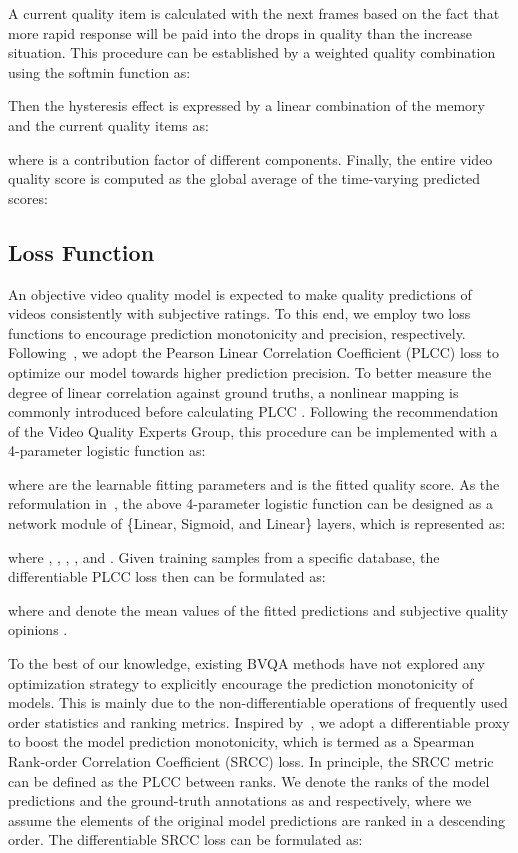 \documentclass[journal]{IEEEtran}
\begin{document}
{{A current quality item  is calculated with the next  frames based on the fact that more rapid response will be paid into the drops in quality than the increase situation. This procedure can be established by a weighted quality combination using the softmin function as:

Then the hysteresis effect is expressed by a linear combination of the memory and the current quality items as:

where  is a contribution factor of different components.
Finally, the entire video quality score is computed as the global average of the time-varying predicted scores:


\subsection{Loss Function}
\label{Sec:LossFunction}


An objective video quality model is expected to make quality predictions of videos consistently with subjective ratings. To this end, we employ two loss functions to encourage prediction monotonicity and precision, respectively. Following~\cite{liu2018end, li2021unified}, we adopt the Pearson Linear Correlation Coefficient (PLCC) loss to optimize our model towards higher prediction precision. To better measure the degree of linear correlation against ground truths, a nonlinear mapping is commonly introduced before calculating PLCC \cite{zhang2020blind, chen2020perceptual}. Following the recommendation of the Video Quality Experts Group, this procedure can be implemented with a 4-parameter logistic function \cite{video2000final} as:

where  are the learnable fitting parameters and  is the fitted quality score. As the reformulation in~\cite{li2021unified}, the above 4-parameter logistic function can be designed as a network module of \{Linear, Sigmoid, and Linear\} layers, which is represented as:

where , , , , and . Given  training samples from a specific database, the differentiable PLCC loss then can be formulated as:

where  and  denote the mean values of the fitted predictions  and subjective quality opinions .

To the best of our knowledge, existing BVQA methods have not explored any optimization strategy to explicitly encourage the prediction monotonicity of models. This is mainly due to the non-differentiable operations of frequently used order statistics and ranking metrics. Inspired by~\cite{blondel2020fast}, we adopt a differentiable proxy to boost the model prediction monotonicity, which is termed as a Spearman Rank-order Correlation Coefficient (SRCC) loss. In principle, the SRCC metric can be defined as the PLCC between ranks. We denote the ranks of the model predictions  and the ground-truth annotations  as  and  respectively, where we assume the elements of the original model predictions are ranked in a descending order. The differentiable SRCC loss can be formulated as:

}}
\end{document}
